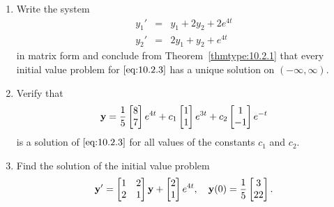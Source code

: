 \documentclass{ximera}
\begin{document}
\begin{example}\label{example:10.2.1}

\begin{enumerate}
\item\label{item:10.2.1a} %
Write the system
\begin{equation} \label{eq:10.2.3}
\begin{array}{rcl}
y_1'&=&y_1+2y_2+2e^{4t} \\
y_2'&=&2y_1+y_2+e^{4t}
\end{array}
\end{equation}
in matrix form and conclude from Theorem~\ref{thmtype:10.2.1} that every
initial value problem for $\eqref{eq:10.2.3}$ has a unique solution on
$(-\infty,\infty)$.
\item\label{item:10.2.1b} %
Verify that
\begin{equation} \label{eq:10.2.4}
{\bf y}=
\frac{1}{5}\begin{bmatrix}8\\7\end{bmatrix}e^{4t}+c_1\begin{bmatrix}1\\1\end{bmatrix}e^{3t}+c_2\begin{bmatrix}1\\-1\end{bmatrix}e^{-t}
\end{equation}
is a solution of $\eqref{eq:10.2.3}$ for all values of the constants $c_1$
and $c_2$.
\item\label{item:10.2.1c} %
Find the  solution of the initial value problem
\begin{equation} \label{eq:10.2.5}
{\bf y}'=\begin{bmatrix}1&2\\2&1\end{bmatrix}{\bf y}+\begin{bmatrix}2\\1\end{bmatrix}e^{4t},\quad  {\bf
y}(0)=\frac{1}{5}\begin{bmatrix}3\\22\end{bmatrix}.
\end{equation}
\end{enumerate}


\end{example}
\end{document}
